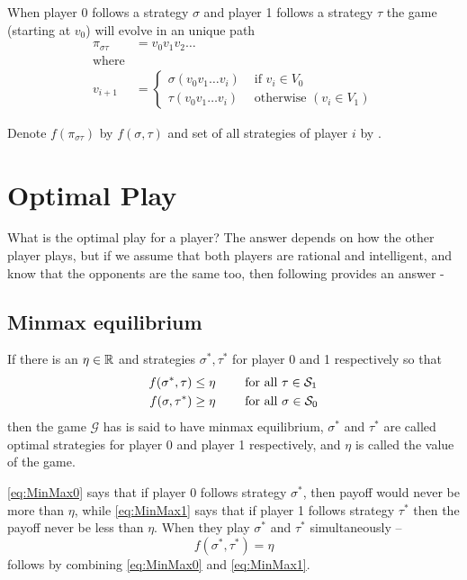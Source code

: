 When player 0 follows a strategy $\sigma$ and player 1 follows a strategy $\tau$ the game (starting at $v_0$) will evolve in an unique path 
\begin{align}
    \pi_{\sigma\tau} &= v_0v_1v_2\ldots\\
    \text{where}\nonumber\\
    v_{i+1} &= 
\begin{cases}
    \sigma(v_0v_1\ldots v_i) & \text{ if } v_i \in V_0\\
    \tau(v_0v_1\ldots v_i) & \text{ otherwise } (v_i \in V_1)
\end{cases}
\end{align}

Denote $f(\pi_{\sigma\tau})$ by $f(\sigma,\tau)$ and set of all strategies of player $i$ by .
\section{Optimal Play}
What is the optimal play for a player? The answer depends on how the other player plays, but if we assume that both players are rational and intelligent, and know that the opponents are the same too, then following provides an answer - 

\subsection{Minmax equilibrium}
If there is an $\eta \in \mathbb{R}$ and strategies $\sigma^*,\tau^*$ for player 0 and 1 respectively so that
\begin{align}
    f(\sigma^*,\tau) \leq \eta \qquad & \text{ for all } \tau \in \mathcal{S}_1  \label{eq:MinMax0} \\
    f(\sigma, \tau^*)  \geq \eta \qquad & \text{ for all } \sigma \in \mathcal{S}_0 \label{eq:MinMax1}
\end{align}
then the game $\mathcal{G}$ has is said to have minmax equilibrium, $\sigma^*$ and $\tau^*$ are called optimal strategies for player 0 and player 1 respectively, and $\eta$ is called the value of the game.

\eqref{eq:MinMax0} says that if player 0 follows strategy $\sigma^*$, then payoff would never be more than $\eta$, while \eqref{eq:MinMax1} says that if player 1 follows strategy $\tau^*$ then the payoff never be less than $\eta$. When they play $\sigma^*$ and $\tau^*$ simultaneously -- 
\[
    f(\sigma^*,\tau^*) = \eta
\]
follows by combining \eqref{eq:MinMax0} and \eqref{eq:MinMax1}.

